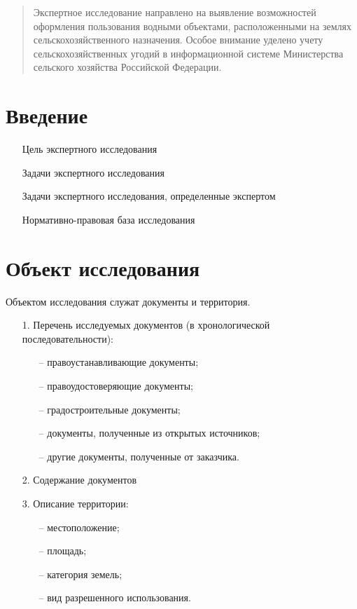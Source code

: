\pagestyle{fancy}
\maketitle

\begin{abstract}
Экспертное исследование направлено на выявление возможностей оформления пользования водными объектами, расположенными на землях сельскохозяйственного назначения. Особое внимание уделено учету сельскохозяйственных угодий в информационной системе Министерства сельского хозяйства Российской Федерации. 
\end{abstract}

\tableofcontents

\section{Введение}
\label{sec:intro}

\begin{enumerate}
    \item[] Цель экспертного исследования
    \item[] Задачи экспертного исследования
    \item[] Задачи экспертного исследования, определенные экспертом 
    \item[] Нормативно-правовая база исследования
\end{enumerate}

\section{Объект исследования}
\label{sec:obj}
Объектом исследования служат документы и территория. 

\begin{enumerate}
    \item[1.] Перечень исследуемых документов (в хронологической последовательности):
    \begin{enumerate}
        \item[--] правоустанавливающие документы;
        \item[--] правоудостоверяющие документы;
        \item[--] градостроительные документы;
        \item[--] документы, полученные из открытых источников;
        \item[--] другие документы, полученные от заказчика.
    \end{enumerate}
    \item[2.] Содержание документов
    \item[3.] Описание территории:
    \begin{enumerate}
        \item[--] местоположение;
        \item[--] площадь;
        \item[--] категория земель;
        \item[--] вид разрешенного использования.
    \end{enumerate}
\end{enumerate}

